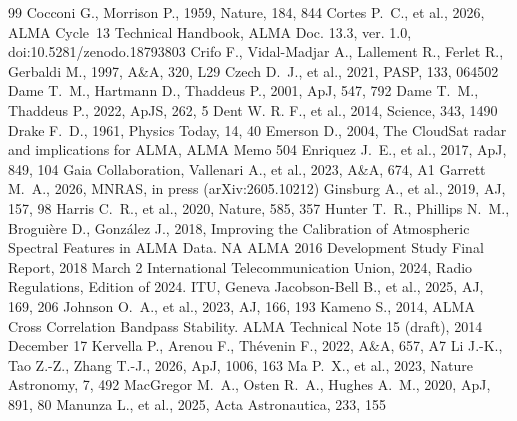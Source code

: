 \documentclass[twocolumn,twocolappendix,numberedappendix,appendixfloats]{openjournal}
\begin{document}
\begin{thebibliography}{99}
 Cocconi G., Morrison P., 1959, Nature, 184, 844
 Cortes P.~C., et al., 2026, ALMA Cycle~13 Technical Handbook, ALMA Doc. 13.3, ver. 1.0, doi:10.5281/zenodo.18793803
 Crifo F., Vidal-Madjar A., Lallement R., Ferlet R., Gerbaldi M., 1997, A\&A, 320, L29
 Czech D.~J., et al., 2021, PASP, 133, 064502
 Dame T.~M., Hartmann D., Thaddeus P., 2001, ApJ, 547, 792
 Dame T.~M., Thaddeus P., 2022, ApJS, 262, 5
 Dent W. R. F., et al., 2014, Science, 343, 1490
 Drake F.~D., 1961, Physics Today, 14, 40
 Emerson D., 2004, The CloudSat radar and implications for ALMA, ALMA Memo 504
 Enriquez J.~E., et al., 2017, ApJ, 849, 104
 Gaia Collaboration, Vallenari A., et al., 2023, A\&A, 674, A1
 Garrett M.~A., 2026, MNRAS, in press (arXiv:2605.10212)
 Ginsburg A., et al., 2019, AJ, 157, 98
 Harris C.~R., et al., 2020, Nature, 585, 357
 Hunter T.~R., Phillips N.~M., Brogui\`{e}re D., Gonz\'{a}lez J., 2018, Improving the Calibration of Atmospheric Spectral Features in ALMA Data. NA ALMA 2016 Development Study Final Report, 2018 March 2
 International Telecommunication Union, 2024, Radio Regulations, Edition of 2024. ITU, Geneva
 Jacobson-Bell B., et al., 2025, AJ, 169, 206
 Johnson O.~A., et al., 2023, AJ, 166, 193
 Kameno S., 2014, ALMA Cross Correlation Bandpass Stability. ALMA Technical Note 15 (draft), 2014 December 17
 Kervella P., Arenou F., Th\'evenin F., 2022, A\&A, 657, A7
 Li J.-K., Tao Z.-Z., Zhang T.-J., 2026, ApJ, 1006, 163
 Ma P.~X., et al., 2023, Nature Astronomy, 7, 492
 MacGregor M.~A., Osten R.~A., Hughes A.~M., 2020, ApJ, 891, 80
 Manunza L., et al., 2025, Acta Astronautica, 233, 155

\end{thebibliography}
\end{document}
